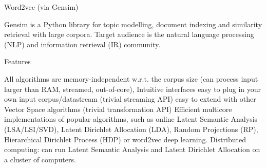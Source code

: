 Word2vec (via Gensim) 

Gensim is a Python library for topic modelling, document indexing and similarity retrieval with large corpora. Target audience is the natural language processing (NLP) and information retrieval (IR) community.

Features

All algorithms are memory-independent w.r.t. the corpus size (can process input larger than RAM, streamed, out-of-core),
Intuitive interfaces
easy to plug in your own input corpus/datastream (trivial streaming API)
easy to extend with other Vector Space algorithms (trivial transformation API)
Efficient multicore implementations of popular algorithms, such as online Latent Semantic Analysis (LSA/LSI/SVD), Latent Dirichlet Allocation (LDA), Random Projections (RP), Hierarchical Dirichlet Process (HDP) or word2vec deep learning.
Distributed computing: can run Latent Semantic Analysis and Latent Dirichlet Allocation on a cluster of computers.
